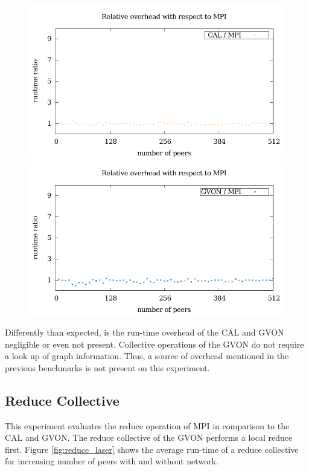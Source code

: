 \begin{figure}[H]
\begin{minipage}[t]{0.5\textwidth}
  \end{minipage}%
  \begin{minipage}[t]{0.5\textwidth}
    \includegraphics[width=\textwidth]{plots/50_collective_network_overhead_cal_laser}
    \includegraphics[width=\textwidth]{plots/50_collective_network_overhead_gvon_laser}
  \end{minipage}%
  \caption{ }
  \label{fig:gather_laser}
\end{figure}

\noindent Differently than expected, is the run-time overhead of the CAL and GVON
negligible or even not present. Collective operations of the GVON
do not require a look up of graph information. Thus, a source of
overhead mentioned in the previous benchmarks is not present on
this experiment.

\subsection*{Reduce Collective}
This experiment evaluates the reduce operation of MPI in comparison to
the CAL and GVON.  The reduce collective of the GVON performs a local
reduce first.  Figure \ref{fig:reduce_laser} shows the average
run-time of a reduce collective for increasing number of peers with
and without network.

